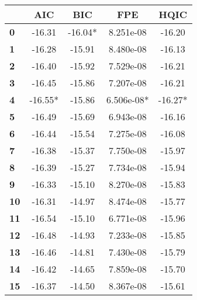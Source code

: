 \begin{center}
\begin{tabular}{lcccc}
\toprule
            & \textbf{AIC} & \textbf{BIC} & \textbf{FPE} & \textbf{HQIC}  \\
\midrule
\textbf{0}  &      -16.31  &     -16.04*  &   8.251e-08  &       -16.20   \\
\textbf{1}  &      -16.28  &      -15.91  &   8.480e-08  &       -16.13   \\
\textbf{2}  &      -16.40  &      -15.92  &   7.529e-08  &       -16.21   \\
\textbf{3}  &      -16.45  &      -15.86  &   7.207e-08  &       -16.21   \\
\textbf{4}  &     -16.55*  &      -15.86  &  6.506e-08*  &      -16.27*   \\
\textbf{5}  &      -16.49  &      -15.69  &   6.943e-08  &       -16.16   \\
\textbf{6}  &      -16.44  &      -15.54  &   7.275e-08  &       -16.08   \\
\textbf{7}  &      -16.38  &      -15.37  &   7.750e-08  &       -15.97   \\
\textbf{8}  &      -16.39  &      -15.27  &   7.734e-08  &       -15.94   \\
\textbf{9}  &      -16.33  &      -15.10  &   8.270e-08  &       -15.83   \\
\textbf{10} &      -16.31  &      -14.97  &   8.474e-08  &       -15.77   \\
\textbf{11} &      -16.54  &      -15.10  &   6.771e-08  &       -15.96   \\
\textbf{12} &      -16.48  &      -14.93  &   7.233e-08  &       -15.85   \\
\textbf{13} &      -16.46  &      -14.81  &   7.430e-08  &       -15.79   \\
\textbf{14} &      -16.42  &      -14.65  &   7.859e-08  &       -15.70   \\
\textbf{15} &      -16.37  &      -14.50  &   8.367e-08  &       -15.61   \\
\bottomrule
\end{tabular}
\end{center}